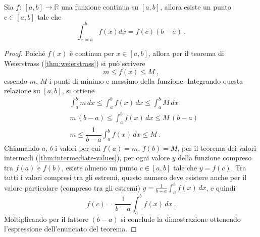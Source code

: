 \begin{theorem}\label{thm:integral:average}
    Sia $f: \ [a,b] \rightarrow \mathbb{R}$ una funzione continua su $[a,b]$, allora esiste un punto $c \in [a,b]$ tale che
    \begin{equation}
        \int_{x=a}^{b} f(x) dx = f(c) (b-a) \ .
    \end{equation}
\end{theorem}
\begin{proof}
    Poiché $f(x)$ è continua per $x \in [a,b]$, allora per il teorema di Weierstrass (\ref{thm:weierstrass}) si può scrivere
    \begin{equation}
        m \le f(x) \le M \ ,
    \end{equation}
    essendo $m$, $M$ i punti di minimo e massimo della funzione. Integrando questa relazione su $[a,b]$, si ottiene
    \begin{equation}
    \begin{aligned}
        & \int_{a}^{b} m \, dx \le \int_{a}^{b} f(x) \, dx \le \int_{a}^{b} M \, dx \\ 
        & m \, (b-a) \le \int_{a}^{b} f(x) \, dx \le M \, (b-a) \\ 
        & m  \le \dfrac{1}{b-a} \int_{a}^{b} f(x) \, dx \le M  \ .
    \end{aligned}
    \end{equation}
    Chiamando $a$, $b$ i valori per cui $f(a) = m$,  $f(b) = M$, per il teorema dei valori intermedi (\ref{thm:intermediate-values}), per ogni valore $y$ della funzione compreso tra $f(a)$ e $f(b)$, esiste almeno un punto $c \in [a,b]$ tale che $y = f(c)$.
    Tra tutti i valori compresi tra gli estremi, questo numero deve esistere anche per il valore particolare (compreso tra gli estremi) $y = \frac{1}{b-a} \int_{a}^{b} f(x) \, dx$, e quindi
    \begin{equation}
       f(c) = \frac{1}{b-a} \int_{a}^{b} f(x) \, dx \ .
    \end{equation}
    Moltiplicando per il fattore $(b-a)$ si conclude la dimostrazione ottenendo l'espressione dell'enunciato del teorema.
\end{proof}


